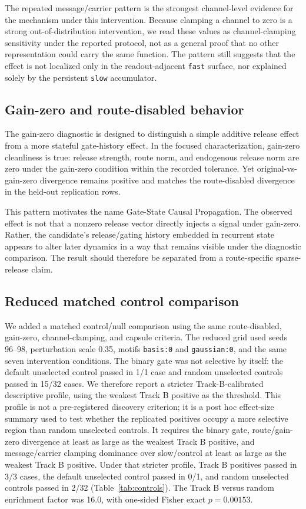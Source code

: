 \documentclass[11pt]{article}
\begin{document}
The repeated message/carrier pattern is the strongest channel-level evidence
for the mechanism under this intervention. Because clamping a channel to zero
is a strong out-of-distribution intervention, we read these values as
channel-clamping sensitivity under the reported protocol, not as a general
proof that no other representation could carry the same function. The pattern
still suggests that the effect is not localized only in the readout-adjacent
\texttt{fast} surface, nor explained solely by the persistent \texttt{slow}
accumulator.

\subsection{Gain-zero and route-disabled behavior}

The gain-zero diagnostic is designed to distinguish a simple additive release
effect from a more stateful gate-history effect. In the focused
characterization, gain-zero cleanliness is true: release strength, route norm,
and endogenous release norm are zero under the gain-zero condition within the
recorded tolerance. Yet original-vs-gain-zero divergence remains positive and
matches the route-disabled divergence in the held-out replication rows.

This pattern motivates the name Gate-State Causal Propagation. The observed
effect is not that a nonzero release vector directly injects a signal under
gain-zero. Rather, the candidate's release/gating history embedded in recurrent
state appears to alter
later dynamics in a way that remains visible under the diagnostic comparison.
The result should therefore be separated from a route-specific sparse-release
claim.

\subsection{Reduced matched control comparison}

We added a matched control/null comparison using the same route-disabled,
gain-zero, channel-clamping, and capsule criteria. The reduced grid used seeds
96--98, perturbation scale 0.35, motifs \texttt{basis:0} and
\texttt{gaussian:0}, and the same seven intervention conditions. The binary
gate was not selective by itself: the default unselected control passed in
1/1 case and random unselected controls passed in 15/32 cases. We therefore
report a stricter Track-B-calibrated descriptive profile, using the weakest
Track B positive as the threshold. This profile is not a pre-registered
discovery criterion; it is a post hoc effect-size summary used to test whether
the replicated positives occupy a more selective region than random unselected
controls. It requires the binary gate, route/gain-zero divergence at least as
large as the weakest Track B positive, and message/carrier clamping dominance
over slow/control at least as large as the weakest Track B positive. Under that
stricter profile, Track B positives passed in 3/3 cases, the default unselected
control passed in 0/1, and random unselected controls passed in 2/32
(Table~\ref{tab:controls}). The Track B versus random enrichment factor was
16.0, with one-sided Fisher exact \(p=0.00153\).
\end{document}
